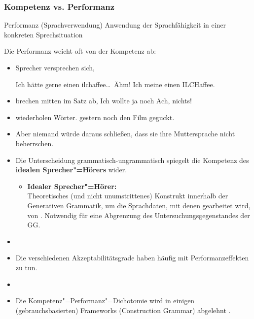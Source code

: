 \begin{frame}
\frametitle{Kompetenz vs. Performanz}

\begin{block}{Performanz (Sprachverwendung)}
Anwendung der Sprachfähigkeit in einer konkreten Sprechsituation \citep[vgl.][]{Fries&MyP16d}	
\end{block}

\end{frame}


\begin{frame}

Die Performanz weicht oft von der Kompetenz ab: 
	\begin{itemize}
		\item Sprecher versprechen sich, 
		
\pause		
		\ea Ich hätte gerne einen ilchaffee\dots\ Ähm! Ich meine einen ILCHaffee.
		\z

\pause	
		\item brechen mitten im Satz ab,
\pause		
		\ea Ich wollte ja noch \alertred{\dots } Ach, nichts!
		\z

		\item wiederholen Wörter.
\pause		
		\ea {} gestern noch den Film geguckt.
		\z

		\item[]	Aber niemand würde daraus schließen, dass sie ihre Muttersprache nicht beherrschen.
	\end{itemize}

\end{frame}


\begin{frame}

\begin{itemize}

	\item Die Unterscheidung grammatisch-ungrammatisch spiegelt die Kompetenz des \textbf{idealen Sprecher"=Hörers} wider.
	\begin{itemize}
		\item [\ras] \textbf{Idealer Sprecher"=Hörer:}\\
			Theoretisches (und nicht unumstrittenes) Konstrukt innerhalb der Generativen Grammatik, um die Sprachdaten, mit denen gearbeitet wird, von . Notwendig für eine Abgrenzung des Untersuchungsgegenstandes der GG. \citep[vgl.][]{Fries16b}
	\end{itemize}
\item []
	\item Die verschiedenen Akzeptabilitätsgrade haben häufig mit Performanzeffekten zu tun.
	\item []
	\item Die Kompetenz"=Performanz"=Dichotomie wird in einigen (gebrauchsbasierten) Frameworks (\zB Construction Grammar) abgelehnt \citep[vgl.][]{MuellerS15b, Nolda&Co14a}. 
\end{itemize}

\end{frame}


